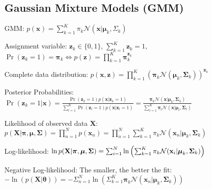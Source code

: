 \documentclass[a4paper, 11pt, landscape]{article}
\begin{document}
\begin{multicols*}{3}
\section{Gaussian Mixture Models (GMM)}
\begin{compactdesc}
	\item[GMM:] $p(\mathbf{x}) = \sum_{k=1}^K \pi_k \mathcal{N}(\mathbf{x} | \boldsymbol{\mu}_k, \Sigma_k)$
	\item[Assignment variable:] $\mathbf{z}_k \in \{0, 1\}$, $\sum_{k=1}^K \mathbf{z}_k = 1$, $\operatorname{Pr}(\mathbf{z}_k = 1) = \boldsymbol{\pi}_k \Leftrightarrow p(\mathbf{z}) = \prod_{k=1}^K \boldsymbol{\pi}_k^{\mathbf{z}_k}$
	\item[Complete data distribution:] $p(\mathbf{x}, \mathbf{z}) = \prod_{k=1}^K \left( \boldsymbol{\pi}_k \mathcal{N}(\boldsymbol{\mu}_k, \boldsymbol{\Sigma}_k) \right)^{\mathbf{z}_k}$
	\item[Posterior Probabilities:] $\operatorname{Pr}(\mathbf{z}_k = 1 | \mathbf{x}) = \frac{\operatorname{Pr}(\mathbf{z}_k = 1) p(\mathbf{x} | \mathbf{z}_k = 1)}{\sum_{l=1}^K \operatorname{Pr}(\mathbf{z}_l = 1) p(\mathbf{x} | \mathbf{z}_l = 1)} = \frac{\boldsymbol{\pi}_k \mathcal{N}(\mathbf{x} | \boldsymbol{\mu}_k, \boldsymbol{\Sigma}_k)}{\sum_{l=1}^K \boldsymbol{\pi}_l \mathcal{N}(\mathbf{x} | \boldsymbol{\mu}_l, \boldsymbol{\Sigma}_l)}$
	\item[Likelihood of observed data $\mathbf{X}$:] $p(\mathbf{X} | \boldsymbol{\pi}, \boldsymbol{\mu}, \boldsymbol{\Sigma}) = \prod_{n=1}^N p(\mathbf{x}_n) = \prod_{n=1}^N \sum_{k=1}^K \pi_k \mathcal{N}(\mathbf{x}_n | \boldsymbol{\mu}_k, \boldsymbol{\Sigma}_k)$
	\item[Log-likelihood:] $\ln p(\mathbf{X} | \boldsymbol{\pi}, \boldsymbol{\mu}, \boldsymbol{\Sigma}) =\break \sum_{i=1}^N \ln \left( \sum_{k=1}^K \pi_k \mathcal{N}(\mathbf{x}_i | \boldsymbol{\mu}_k, \boldsymbol{\Sigma}_k) \right)$
	\item[Negative Log-likelihood:] The smaller, the better the fit: $-\ln(p(\mathbf{X} | \mathbf{\theta})) = -\Sigma_{n=1}^N \ln\left( \Sigma_{k=1}^K \boldsymbol{\pi}_k \mathcal{N}(\mathbf{x}_n | \boldsymbol{\mu}_k, \boldsymbol{\Sigma}_k) \right)$
\end{compactdesc}


\end{multicols*}
\end{document}
